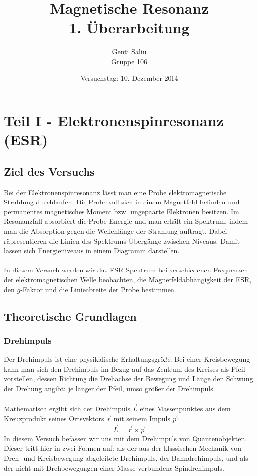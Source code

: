 \documentclass[a4paper,titlepage]{scrartcl}
\title{Magnetische Resonanz\\\normalsize 1. Überarbeitung}
\author{Genti Saliu\\Gruppe 106}
\date{Versuchstag: 10. Dezember 2014}
\numberwithin{equation}{section}
\begin{document}
	\begin{titlepage}
		\maketitle
		\thispagestyle{empty}
	\end{titlepage}

\newpage
{}
\tableofcontents

\newpage
{}

\section{Teil I - Elektronenspinresonanz (ESR)}
\subsection{Ziel des Versuchs}
Bei der Elektronenspinresonanz lässt man eine Probe elektromagnetische Strahlung durchlaufen. Die Probe soll sich in einem Magnetfeld befinden und permanentes magnetisches Moment bzw. ungepaarte Elektronen besitzen. Im Resonanzfall absorbiert die Probe Energie und man erhält ein Spektrum, indem man die Absorption gegen die Wellenlänge der Strahlung auftragt. Dabei räpresentieren die Linien des Spektrums Übergänge zwischen Niveaus. Damit lassen sich Energieniveaus in einem Diagramm darstellen.\\ \\
In diesem Versuch werden wir das ESR-Spektrum bei verschiedenen Frequenzen der elektromagnetischen Welle beobachten, die Magnetfeldabhängigkeit der ESR, den $g$-Faktor und die Linienbreite der Probe bestimmen.
\subsection{Theoretische Grundlagen}
\subsubsection{Drehimpuls \cite{wiki:drehimpuls}}
Der Drehimpuls ist eine physikalische Erhaltungsgröße. Bei einer Kreisbewegung kann man sich den Drehimpuls im Bezug auf das Zentrum des Kreises als Pfeil vorstellen, dessen Richtung die Drehachse der Bewegung und Länge den Schwung der Drehung angibt: je länger der Pfeil, umso größer der Drehimpuls.\\ \\
Mathematisch ergibt sich der Drehimpuls $\vec{L}$ eines Massenpunktes aus dem Kreuzprodukt seines Ortsvektors $\vec{r}$ mit seinem Impuls $\vec{p}$:
\begin{equation*}
\vec{L} = \vec{r} \times \vec{p}
\end{equation*}
In diesem Versuch befassen wir uns mit dem Drehimpuls von Quantenobjekten. Dieser tritt hier in zwei Formen auf: als der aus der klassischen Mechanik von Dreh- und Kreisbewegung abgeleitete Drehimpuls, der Bahndrehimpuls, und als der nicht mit Drehbewegungen einer Masse verbundene Spindrehimpuls.
\end{document}
